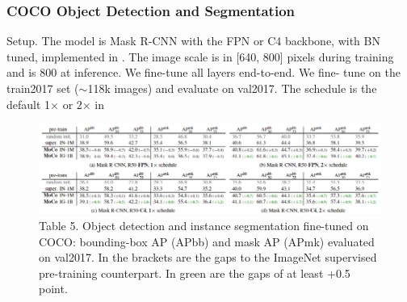 \documentclass[10pt,twocolumn]{article}  %
\begin{document}
\subsubsection{COCO Object Detection and Segmentation}
Setup. The model is Mask R-CNN \cite{32_he2017mask} with the FPN \cite{41_lin2017feature}
or C4 backbone, with BN tuned, implemented in \cite{60_wu2019detectron2}. The
image scale is in [640, 800] pixels during training and is 800
at inference. We ﬁne-tune all layers end-to-end. We ﬁne-
tune on the train2017 set ($\sim $118k images) and evaluate
on val2017. The schedule is the default 1$\times $ or 2$\times $ in


\FloatBarrier
\begin{figure}[h!]
    \centering
    \includegraphics[width=0.8\linewidth]{Pic/table5.png} %
    \captionsetup{labelformat=empty}
    \caption{Table 5. Object detection and instance segmentation ﬁne-tuned on COCO: bounding-box AP (APbb) and mask AP (APmk) evaluated
    on val2017. In the brackets are the gaps to the ImageNet supervised pre-training counterpart. In green are the gaps of at least +0.5 point.} %
    \label{fig:Table 5} %
\end{figure}
\end{document}
